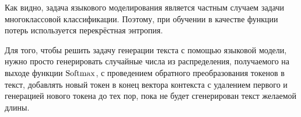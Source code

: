 Как видно, задача языкового моделирования является частным случаем задачи многоклассовой классификации. Поэтому, при обучении в качестве функции потерь используется перекрёстная энтропия.

Для того, чтобы решить задачу генерации текста с помощью языковой модели, нужно просто генерировать случайные числа из распределения, получаемого на выходе функции $\operatorname{Softmax}$, с проведением обратного преобразования токенов в текст, добавлять новый токен в конец вектора контекста с удалением первого и генерацией нового токена до тех пор, пока не будет сгенерирован текст желаемой длины.

